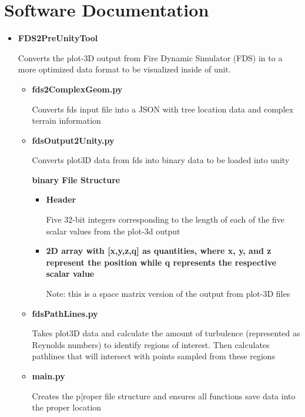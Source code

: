 
\chapter{Software Documentation} %

\label{Appendix-PreUnity} %
\begin{itemize}
\item \textbf{FDS2PreUnityTool}
\item[]
Converts the plot-3D output from Fire Dynamic Simulator (FDS) in to a more optimized data format to be visualized inside of unit. 
   \begin{itemize}
        \item \textbf{fds2ComplexGeom.py}
        \item[] Converts fds input file into a JSON with tree location data and complex terrain information
        \item \textbf{fdsOutput2Unity.py}
        \item[] Converts plot3D data from fds into binary data to be loaded into unity
                    \item[] \textbf{binary File Structure}   
                \begin{itemize}
                \item\textbf{Header}
                \item[] Five 32-bit integers corresponding to the length of each of the five scalar values from the plot-3d output
                \item\textbf{ 2D array with [x,y,z,q] as quantities, where x, y, and z represent the position while q represents the respective scalar value } 
                \item[Note:] this is a space matrix version of the output from plot-3D files
                \end{itemize}
        \item \textbf{fdsPathLines.py}
        \item[] Takes plot3D data and calculate the amount of turbulence (represented as Reynolds numbers) to identify regions of interest. Then calculates pathlines that will intersect with points sampled from these regions
        \item \textbf{main.py}
        \item[] Creates the p[roper file structure and ensures all functions save data into the proper location  
   \end{itemize}
\pagebreak


\end{itemize}
